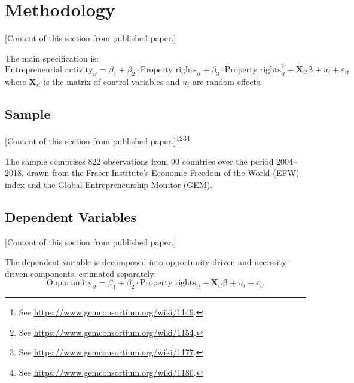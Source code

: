 \documentclass[12pt]{article}
\begin{document}
\section{Methodology}\label{sec:methodology}

[Content of this section from published paper.]

The main specification is:
\begin{equation}\label{eq:main}
    \text{Entrepreneurial activity}_{it} = \beta_1 + \beta_2 \cdot \text{Property rights}_{it} + \beta_3 \cdot \text{Property rights}_{it}^{2} + \mathbf{X}_{it}\boldsymbol{\beta} + u_i + \varepsilon_{it}
\end{equation}
where $\mathbf{X}_{it}$ is the matrix of control variables and $u_i$ are random effects.

\subsection{Sample}\label{subsec:sample}

[Content of this section from published paper.]\footnote{See \url{https://www.gemconsortium.org/wiki/1149}.}\footnote{See \url{https://www.gemconsortium.org/wiki/1154}.}\footnote{See \url{https://www.gemconsortium.org/wiki/1177}.}\footnote{See \url{https://www.gemconsortium.org/wiki/1180}.}

The sample comprises 822 observations from 90 countries over the period 2004--2018, drawn from the Fraser Institute's Economic Freedom of the World (EFW) index and the Global Entrepreneurship Monitor (GEM).

\subsection{Dependent Variables}\label{subsec:dependent_variables}

[Content of this section from published paper.]

The dependent variable is decomposed into opportunity-driven and necessity-driven components, estimated separately:
\begin{equation}\label{eq:opportunity}
    \text{Opportunity}_{it} = \beta_1 + \beta_2 \cdot \text{Property rights}_{it} + \mathbf{X}_{it}\boldsymbol{\beta} + u_i + \varepsilon_{it}
\end{equation}
\end{document}

